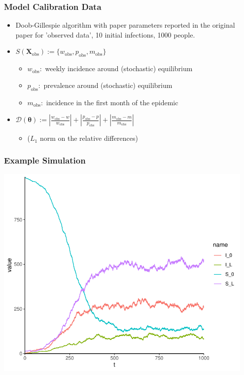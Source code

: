 \documentclass{beamer}
\begin{document}
\begin{frame}
    \frametitle{Model Calibration Data}\begin{itemize}
        \item Doob-Gillespie algorithm with paper parameters reported in the original paper for 'observed data', 10 initial infections, 1000 people.
        \item <2->$S(\mathbf{X}_\text{obs}) := \{w_\text{obs}, p_\text{obs}, m_\text{obs}\}$ \begin{itemize}
                  \item $w_\text{obs}:$ weekly incidence around (stochastic) equilibrium
                  \item $p_\text{obs}:$ prevalence around (stochastic) equilibrium
                  \item $m_\text{obs}:$ incidence in the first month of the epidemic
              \end{itemize}
        \item <3-> $\mathcal{D}(\bm{\theta}) := \left|\frac{w_\text{obs} - w}{w_\text{obs}}\right| + \left|\frac{p_\text{obs} - p}{p_\text{obs}}\right| + \left|\frac{m_\text{obs} - m}{m_\text{obs}}\right|$ \begin{itemize}
                  \item ($L_1$ norm on the relative differences)
              \end{itemize}
    \end{itemize}
\end{frame}

\begin{frame}
    \frametitle{Example Simulation}
    \includegraphics[width=0.95\textwidth]{doob_champagne.pdf}
\end{frame}
\end{document}
